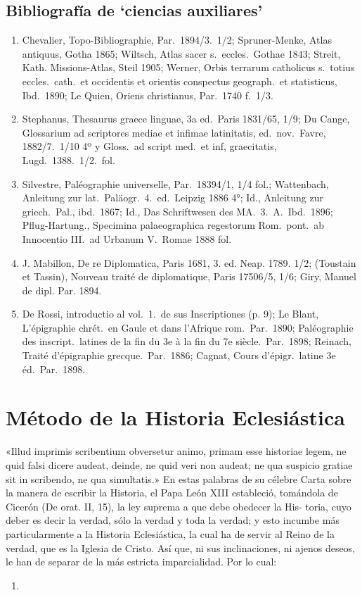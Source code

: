 \raggedbottom{} \documentclass[12pt, a4paper]{book}
\begin{document}
\subsection{Bibliografía de `ciencias auxiliares'}
\begin{enumerate}
  \item Chevalier, Topo-Bibliographie, Par.\ 1894/3.\ 1/2; Spruner-Menke, Atlas antiquus, Gotha 1865; Wiltsch, Atlas sacer s.\ eccles.\ Gothae 1843; Streit, Kath. Missions-Atlas, Steil 1905; Werner, Orbis terrarum catholicus s.\ totius eccles.\ cath.\ et occidentis et orientis conspectus geograph.\ et statisticus, Ibd.\ 1890; Le Quien, Oriens christianus, Par.\ 1740 f.\ 1/3.
  \item Stephanus, Thesaurus graece linguae, 3a ed.\ Paris 1831/65, 1/9; Du Cange, Glossarium ad scriptores mediae et infimae latinitatis, ed.\ nov.\ Favre, 1882/7.\ 1/10 4º y Gloss.\ ad script med.\ et inf, graecitatis, Lugd.\ 1388.\ 1/2.\ fol.\
  \item Silvestre, Paléographie universelle, Par.\ 18394/1, 1/4 fol.; Wattenbach, Anleitung zur lat.\ Paläogr.\ 4.\ ed.\ Leipzig 1886 4°; Id., Anleitung zur griech.\ Pal., ibd.\ 1867; Id., Das Schriftwesen des MA.\ 3.\ A.\ Ibd.\ 1896; Pflug-Hartung., Specimina palaeographica regestorum Rom.\ pont.\ ab Innocentio III.\ ad Urbanum V.\ Romae 1888 fol.
  \item J. Mabillon, De re Diplomatica, Paris 1681, 3. ed. Neap. 1789. 1/2; (Toustain et Tassin), Nouveau traité de diplomatique, Paris 17506/5, 1/6; Giry, Manuel de dipl. Par. 1894.
  \item De Rossi, introductio al vol.\ 1.\ de sus Inscriptiones (p. 9); Le Blant, L'épigraphie chrét.\ en Gaule et dans l'Afrique rom.\ Par.\ 1890; Paléographie des inscript.\ latines de la fin du 3e à la fin du 7e siècle.\ Par.\ 1898; Reinach, Traité d'épigraphie grecque.\ Par.\ 1886; Cagnat, Cours d'épigr.\ latine 3e éd.\ Par.\ 1898.
\end{enumerate}
\section{Método de la Historia Eclesiástica}
«Illud imprimis scribentium obversetur animo, primam esse
historiae legem, ne quid falsi dicere audeat, deinde, ne quid veri
non audeat; ne qua suspicio gratiae sit in scribendo, ne qua
simultatis.» En estas palabras de su célebre Carta sobre la manera
de escribir la Historia, el Papa León XIII estableció, tomándola de
Cicerón (De orat. II, 15), la ley suprema a que debe obedecer la His-
toria, cuyo deber es decir la verdad, sólo la verdad y toda la verdad;
y esto incumbe más particularmente a la Historia Eclesiástica, la cual
ha de servir al Reino de la verdad, que es la Iglesia de Cristo. Así
que, ni sus inclinaciones, ni ajenos deseos, le han de separar de la
más estricta imparcialidad. Por lo cual:
\begin{enumerate}
  \item 
\end{enumerate}
\end{document}
